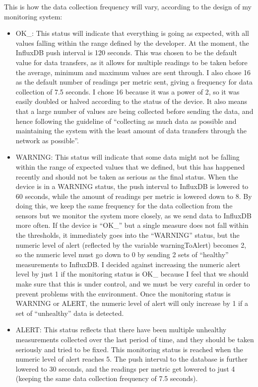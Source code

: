 \documentclass[12pt]{article}
\begin{document}
This is how the data collection frequency will vary, according to the design of my monitoring system: 
\begin{itemize}
    \item OK\_: This status will indicate that everything is going as expected, with all values falling within the range defined by the developer. At the moment, the InfluxDB push interval is 120 seconds. This was chosen to be the default value for data transfers, as it allows for multiple readings to be taken before the average, minimum and maximum values are sent through. I also chose 16 as the default number of readings per metric sent, giving a frequency for data collection of 7.5 seconds. I chose 16 because it was a power of 2, so it was easily doubled or halved according to the status of the device. It also means that a large number of values are being collected before sending the data, and hence following the guideline of ``collecting as much data as possible and maintaining the system with the least amount of data transfers through the network as possible''.
    \item WARNING: This status will indicate that some data might not be falling within the range of expected values that we defined, but this has happened recently and should not be taken as serious as the final status. When the device is in a WARNING status, the push interval to InfluxDB is lowered to 60 seconds, while the amount of readings per metric is lowered down to 8. By doing this, we keep the same frequency for the data collection from the sensors but we monitor the system more closely, as we send data to InfluxDB more often. If the device is ``OK\_'' but a single measure does not fall within the thresholds, it immediately goes into the ``WARNING'' status, but the numeric level of alert (reflected by the variable warningToAlert) becomes 2, so the numeric level must go down to 0 by sending 2 sets of ``healthy'' measurements to InfluxDB. I decided against increasing the numeric alert level by just 1 if the monitoring status is OK\_ because I feel that we should make sure that this is under control, and we must be very careful in order to prevent problems with the environment. Once the monitoring status is WARNING or ALERT, the numeric level of alert will only increase by 1 if a set of ``unhealthy'' data is detected.
    \item ALERT: This status reflects that there have been multiple unhealthy measurements collected over the last period of time, and they should be taken seriously and tried to be fixed. This monitoring status is reached when the numeric level of alert reaches 5. The push interval to the database is further lowered to 30 seconds, and the readings per metric get lowered to just 4 (keeping the same data collection frequency of 7.5 seconds). 
\end{itemize}
\end{document}
